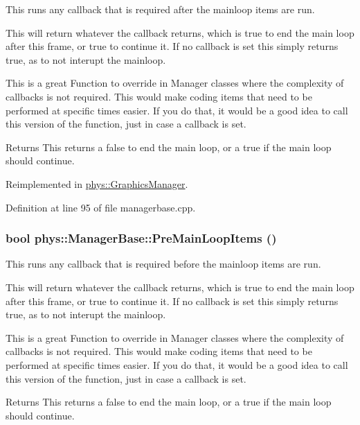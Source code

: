 This runs any callback that is required after the mainloop items are run. 

This will return whatever the callback returns, which is true to end the main loop after this frame, or true to continue it. If no callback is set this simply returns true, as to not interupt the mainloop. \par
 This is a great Function to override in Manager classes where the complexity of callbacks is not required. This would make coding items that need to be performed at specific times easier. If you do that, it would be a good idea to call this version of the function, just in case a callback is set. \begin{DoxyReturn}{Returns}
This returns a false to end the main loop, or a true if the main loop should continue. 
\end{DoxyReturn}


Reimplemented in \hyperlink{classphys_1_1GraphicsManager_ae2330172be150cd4d12aa2ed62b0474c}{phys::GraphicsManager}.



Definition at line 95 of file managerbase.cpp.

\hypertarget{classphys_1_1ManagerBase_af6210834a8af592481cf6aefa9916d88}{
\subsubsection[{PreMainLoopItems}]{\setlength{\rightskip}{0pt plus 5cm}bool phys::ManagerBase::PreMainLoopItems ()}}
\label{d2/de3/classphys_1_1ManagerBase_af6210834a8af592481cf6aefa9916d88}


This runs any callback that is required before the mainloop items are run. 

This will return whatever the callback returns, which is true to end the main loop after this frame, or true to continue it. If no callback is set this simply returns true, as to not interupt the mainloop. \par
 This is a great Function to override in Manager classes where the complexity of callbacks is not required. This would make coding items that need to be performed at specific times easier. If you do that, it would be a good idea to call this version of the function, just in case a callback is set. \begin{DoxyReturn}{Returns}
This returns a false to end the main loop, or a true if the main loop should continue. 
\end{DoxyReturn}


